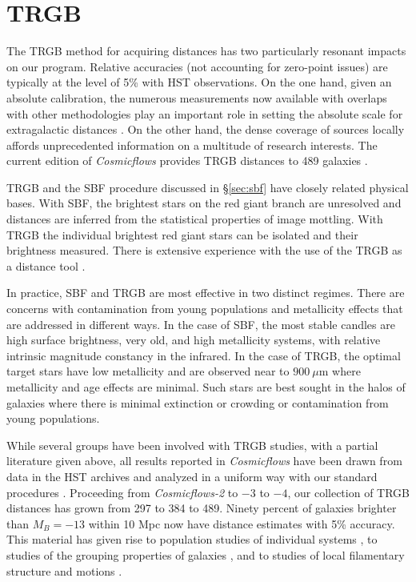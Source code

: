 \documentclass[twocolumn]{aastex63}
\begin{document}

\section{TRGB}
\label{sec:trgb}

The TRGB method for acquiring distances has two particularly resonant impacts on our program.  Relative accuracies (not accounting for zero-point issues) are typically at the level of 5\% with HST observations.  On the one hand, given an absolute calibration, the numerous measurements now available with overlaps with other methodologies play an important role in setting the absolute scale for extragalactic distances \citep{2019ApJ...882...34F, 2022ApJ...932...15A}.  On the other hand, the dense coverage of sources locally affords unprecedented information on a multitude of research interests.  The current edition of {\it Cosmicflows} provides TRGB distances to 489 galaxies \citep{2021AJ....162...80A}.

TRGB and the SBF procedure discussed in \S \ref{sec:sbf} have closely related physical bases.  With SBF, the brightest stars on the red giant branch are unresolved and distances are inferred from the statistical properties of image mottling. With TRGB the individual brightest red giant stars can be isolated and their brightness measured.  There is extensive experience with the use of the TRGB as a distance tool \citep{1990AJ....100..162D, 1993ApJ...417..553L, 1995AJ....109.1645M, 2002AJ....124..213M, 2006AJ....132.2729M, 2007ApJ...661..815R, 2014AJ....148....7W, 2017AJ....154...51M, 2017ApJ...835...28J, 2018SSRv..214..113B}. 

In practice, SBF and TRGB are most effective in two distinct regimes.  There are concerns with contamination from young populations and metallicity effects that are addressed in different ways.  In the case of SBF, the most stable candles are high surface brightness, very old, and high metallicity systems, with relative intrinsic magnitude constancy in the infrared.  In the case of TRGB, the optimal target stars have low metallicity and are observed near to $900~\mu$m where metallicity and age effects are minimal.  Such stars are best sought in the halos of galaxies where there is minimal extinction or crowding or contamination from young populations.

While several groups have been involved with TRGB studies, with a partial literature given above, all results reported in {\it Cosmicflows} have been drawn from data in the HST archives and analyzed in a uniform way with our standard procedures \citep{2009AJ....138..332J, 2021AJ....162...80A}.  Proceeding from {\it Cosmicflows-2} to $-3$ to $-4$, our collection of TRGB distances has grown from 297 to 384 to 489.  Ninety percent of galaxies brighter than $M_B = -13$ within 10 Mpc now have distance estimates with 5\% accuracy.  This material has given rise to population studies of individual systems \citep{2017MNRAS.464.2281M, 2017MNRAS.469L.113K}, to studies of the grouping properties of galaxies \citep{2017ApJ...843...16K}, and to studies of local filamentary structure and motions \citep{2017ApJ...850..207S, 2019ApJ...880...52A}.
\end{document}
